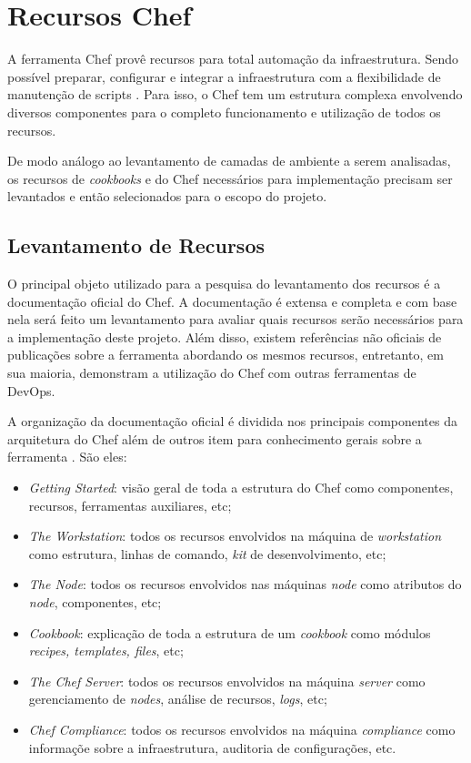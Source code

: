 \section{Recursos Chef}
\label{sec:rec-chef}

A ferramenta Chef provê recursos para total automação da infraestrutura.
Sendo possível preparar, configurar e integrar a infraestrutura com a
flexibilidade de manutenção de scripts \cite{sharma:2015}. Para isso, o
Chef tem um estrutura complexa envolvendo diversos componentes para
o completo funcionamento e utilização de todos os recursos.

De modo análogo ao levantamento de camadas de ambiente a serem analisadas,
os recursos de \textit{cookbooks} e do Chef necessários para implementação precisam
ser levantados e então selecionados para o escopo do projeto.

\subsection{Levantamento de Recursos}
\label{sec:levn-rec}

O principal objeto utilizado para a pesquisa do levantamento dos recursos
é a documentação oficial do Chef. A documentação é extensa e completa e
com base nela será feito um levantamento para avaliar quais recursos
serão necessários para a implementação deste projeto. Além disso, existem
referências não oficiais de publicações sobre a ferramenta abordando os
mesmos recursos, entretanto, em sua maioria, demonstram a utilização do
Chef com outras ferramentas de DevOps.

A organização da documentação oficial é dividida nos principais componentes
da arquitetura do Chef além de outros item para conhecimento gerais sobre a
ferramenta \cite{chefdoc:2016}. São eles:

\begin{itemize}
  \item \textit{Getting Started}: visão geral de toda a estrutura do Chef
    como componentes, recursos, ferramentas auxiliares, etc;
  \item \textit{The Workstation}: todos os recursos envolvidos na máquina de \textit{workstation}
    como estrutura, linhas de comando, \textit{kit} de desenvolvimento, etc;
  \item \textit{The Node}: todos os recursos envolvidos nas máquinas \textit{node}
    como atributos do \textit{node}, componentes, etc;
  \item \textit{Cookbook}: explicação de toda a estrutura de um \textit{cookbook}
    como módulos \textit{recipes, templates, files}, etc;
  \item \textit{The Chef Server}: todos os recursos envolvidos na máquina \textit{server}
    como gerenciamento de \textit{nodes}, análise de recursos, \textit{logs}, etc;
  \item \textit{Chef Compliance}: todos os recursos envolvidos na máquina \textit{compliance}
    como informaçõe sobre a infraestrutura, auditoria de configurações, etc.
\end{itemize}

